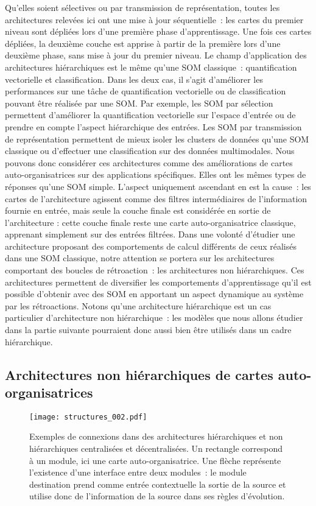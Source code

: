 \documentclass[../main]{subfiles}
\begin{document}
Qu'elles soient sélectives ou par transmission de représentation, toutes les architectures relevées ici ont une mise à jour séquentielle~: les cartes du premier niveau sont dépliées lors d'une première phase d'apprentissage. Une fois ces cartes dépliées, la deuxième couche est apprise à partir de la première lors d'une deuxième phase, sans mise à jour du premier niveau.
Le champ d'application des architectures hiérarchiques est le même qu'une SOM classique~: quantification vectorielle et classification.
Dans les deux cas, il s'agit d'améliorer les performances sur une tâche de quantification vectorielle ou de classification pouvant être réalisée par une SOM. 
Par exemple, les SOM par sélection permettent d'améliorer la quantification vectorielle sur l'espace d'entrée ou de prendre en compte l'aspect hiérarchique des entrées. Les SOM par transmission de représentation permettent de mieux isoler les clusters de données qu'une SOM classique ou d'effectuer une classification sur des données multimodales.
Nous pouvons donc considérer ces architectures comme des améliorations de cartes auto-organisatrices sur des applications spécifiques.
Elles ont les mêmes types de réponses qu'une SOM simple.
L'aspect uniquement ascendant en est la cause~: les cartes de l'architecture agissent comme des filtres intermédiaires de l'information fournie en entrée, mais seule la couche finale est considérée en sortie de l'architecture : cette couche finale reste une carte auto-organisatrice classique, apprenant simplement sur des entrées filtrées.
Dans une volonté d'étudier une architecture proposant des comportements de calcul différents de ceux réalisés dans une SOM classique, notre attention se portera sur les architectures comportant des boucles de rétroaction~: les architectures non hiérarchiques.
Ces architectures permettent de diversifier les comportements d'apprentissage qu'il est possible d'obtenir avec des SOM en apportant un aspect dynamique au système par les rétroactions. 
Notons qu'une architecture hiérarchique est un cas particulier d'architecture non hiérarchique~: les modèles que nous allons étudier dans la partie suivante pourraient donc aussi bien être utilisés dans un cadre hiérarchique.


\subsection{Architectures non hiérarchiques de cartes auto-organisatrices}

\begin{figure}
    \centering\texttt{[image: structures\_002.pdf]}
    \caption{Exemples de connexions dans des architectures hiérarchiques et non hiérarchiques centralisées et décentralisées. Un rectangle correspond à un module, ici une carte auto-organisatrice. Une flèche représente l'existence d'une interface entre deux modules~: le module destination prend comme entrée contextuelle la sortie de la source et utilise donc de l'information de la source dans ses règles d'évolution. \label{fig:structure}}
    \end{figure}
\end{document}
